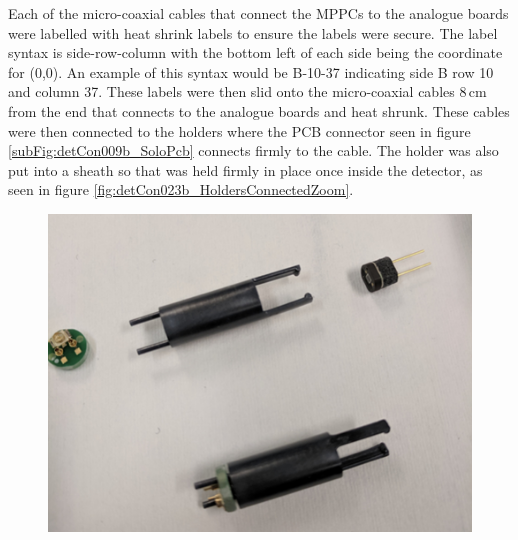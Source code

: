 Each of the micro-coaxial cables that connect the MPPCs to the analogue boards were labelled with heat shrink labels to ensure the labels were secure. The label syntax is side-row-column with the bottom left of each side being the coordinate for (0,0). An example of this syntax would be B-10-37 indicating side B row 10 and column 37. These labels were then slid onto the micro-coaxial cables 8\,cm from the end that connects to the analogue boards and heat shrunk. These cables were then connected to the holders where the PCB connector seen in figure \ref{subFig:detCon009b_SoloPcb} connects firmly to the cable. The holder was also put into a sheath so that was held firmly in place once inside the detector, as seen in figure \ref{fig:detCon023b_HoldersConnectedZoom}.

\begin{figure}[!h]
\centering
\begin{minipage}{.45\textwidth}
  \centering
  \includegraphics[width=\linewidth]{Chapter3/Figs/Raster/detCon017b_HoldersWithParts.png}
  \label{fig:detCon017b_HoldersWithParts}
\end{minipage}%
\qquad
\begin{minipage}{.45\textwidth}
  \centering

\end{minipage}
\end{figure}
